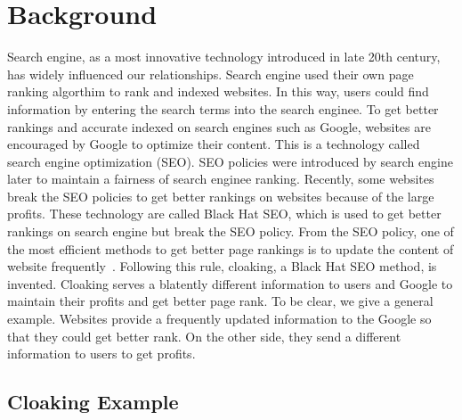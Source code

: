 \section{Background}
\label{s:related-work}
Search engine, as a most innovative technology introduced in late 20th century, has widely influenced our relationships. Search engine used their own page ranking algorthim to rank and indexed websites. In this way, users could find information by entering the search terms into the search enginee. To get better rankings and accurate indexed on search engines such as Google, websites are encouraged by Google to optimize their content. This is a technology called search engine optimization (SEO).
SEO policies were introduced by search engine later to maintain a fairness of search enginee ranking. Recently, some websites break the SEO policies to get better rankings on websites because of the large profits. These technology are called Black Hat SEO, which is used to get better rankings on search engine but break the SEO policy.
From the SEO policy, one of the most efficient methods to get better page rankings is to update the content of website frequently~\cite{wang2011cloak}.
Following this rule, cloaking, a Black Hat SEO method, is invented. Cloaking serves a blatently different information to users and Google to maintain their
profits and get better page rank. To be clear, we give a general example. Websites provide a frequently updated information to the Google so that they could get
better rank. On the other side, they send a different information to users to get profits.

\subsection{Cloaking Example}


